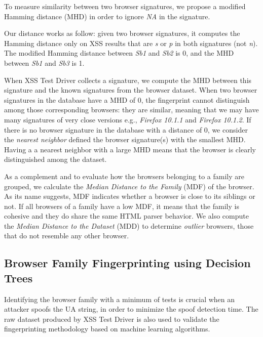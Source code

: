 \documentclass[10pt]{IEEEtran}
\begin{document}
To measure similarity between two browser signatures, we propose a modified Hamming distance (MHD) 
in order to ignore \emph{NA} in the signature. 




Our distance works as follow: given two browser signatures, it computes the Hamming distance only on XSS results that are \emph{s} or \emph{p} in both signatures (not \emph{n}).
The modified Hamming distance between \emph{Sb1} and \emph{Sb2} is 0, and the MHD between \emph{Sb1} and \emph{Sb3} is 1.

When XSS Test Driver collects a signature,  we compute the MHD between this signature and the known signatures from the browser dataset. When two browser signatures in the database have a MHD of 0, the fingerprint cannot distinguish among those corresponding browsers: they are similar,
meaning that we may have many signatures of very close versions e.g., \emph{Firefox 10.1.1} and \emph{Firefox 10.1.2}. If there is no browser signature in  the database with a distance of 0, we consider the \emph{nearest neighbor} defined the browser signature(s) with the smallest MHD. Having a a nearest neighbor with a large MHD means that the browser is clearly distinguished among the dataset.

As a complement and to evaluate how the browsers belonging to a family are grouped, we calculate the \emph{Median Distance to the Family} (MDF) of the browser. As its name suggests, MDF indicates whether a browser is close to its siblings or not.
If all browsers of a family have a low MDF, it means that the family is cohesive and they do share the same HTML parser behavior.
We also compute the  \emph{Median Distance to the Dataset} (MDD) to determine 
\textit{outlier} browsers, those that do not resemble any other browser.


\subsection{Browser Family Fingerprinting using Decision Trees}
Identifying the browser family with a minimum of tests is crucial when an attacker
spoofs the UA string, in order to minimize the spoof detection time. 
The raw dataset produced by XSS Test Driver is also used to validate
the fingerprinting methodology based on machine learning algorithms. 
\end{document}
